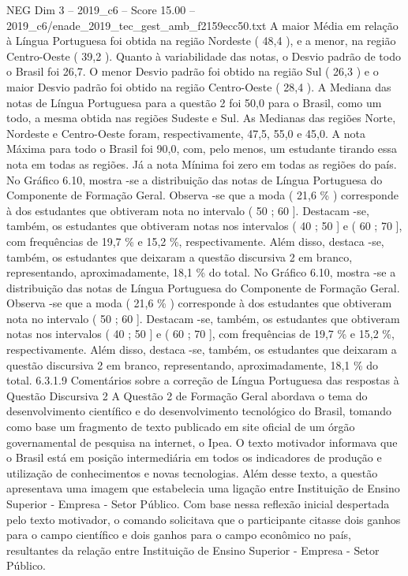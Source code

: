 \begin{textsample}{NEG Dim 3 – 2019\_c6 – Score 15.00 – 2019\_c6/enade\_2019\_tec\_gest\_amb\_f2159ecc50.txt}
A maior Média em relação à Língua Portuguesa foi obtida na região Nordeste ( 48,4 ), e a menor, na região Centro-Oeste ( 39,2 ).
Quanto à variabilidade das notas, o Desvio padrão de todo o Brasil foi 26,7.
O menor Desvio padrão foi obtido na região Sul ( 26,3 ) e o maior Desvio padrão foi obtido na região Centro-Oeste ( 28,4 ).
A Mediana das notas de Língua Portuguesa para a questão 2 foi 50,0 para o Brasil, como um todo, a mesma obtida nas regiões Sudeste e Sul.
As Medianas das regiões Norte, Nordeste e Centro-Oeste foram, respectivamente, 47,5, 55,0 e 45,0.
A nota Máxima para todo o Brasil foi 90,0, com, pelo menos, um estudante tirando essa nota em todas as regiões.
Já a nota Mínima foi zero em todas as regiões do país.
No Gráfico 6.10, mostra -se a distribuição das notas de Língua Portuguesa do Componente de Formação Geral.
Observa -se que a moda ( 21,6 \% ) corresponde à dos estudantes que obtiveram nota no intervalo ( 50 ; 60 ].
Destacam -se, também, os estudantes que obtiveram notas nos intervalos ( 40 ; 50 ] e ( 60 ; 70 ], com frequências de 19,7 \% e 15,2 \%, respectivamente.
Além disso, destaca -se, também, os estudantes que deixaram a questão discursiva 2 em branco, representando, aproximadamente, 18,1 \% do total.
No Gráfico 6.10, mostra -se a distribuição das notas de Língua Portuguesa do Componente de Formação Geral.
Observa -se que a moda ( 21,6 \% ) corresponde à dos estudantes que obtiveram nota no intervalo ( 50 ; 60 ].
Destacam -se, também, os estudantes que obtiveram notas nos intervalos ( 40 ; 50 ] e ( 60 ; 70 ], com frequências de 19,7 \% e 15,2 \%, respectivamente.
Além disso, destaca -se, também, os estudantes que deixaram a questão discursiva 2 em branco, representando, aproximadamente, 18,1 \% do total. 6.3.1.9 Comentários sobre a correção de Língua Portuguesa das respostas à Questão Discursiva 2 A Questão 2 de Formação Geral abordava o tema do desenvolvimento científico e do desenvolvimento tecnológico do Brasil, tomando como base um fragmento de texto publicado em site oficial de um órgão governamental de pesquisa na internet, o Ipea.
O texto motivador informava que o Brasil está em posição intermediária em todos os indicadores de produção e utilização de conhecimentos e novas tecnologias.
Além desse texto, a questão apresentava uma imagem que estabelecia uma ligação entre Instituição de Ensino Superior - Empresa - Setor Público.
Com base nessa reflexão inicial despertada pelo texto motivador, o comando solicitava que o participante citasse dois ganhos para o campo científico e dois ganhos para o campo econômico no país, resultantes da relação entre Instituição de Ensino Superior - Empresa - Setor Público.

\end{textsample}
